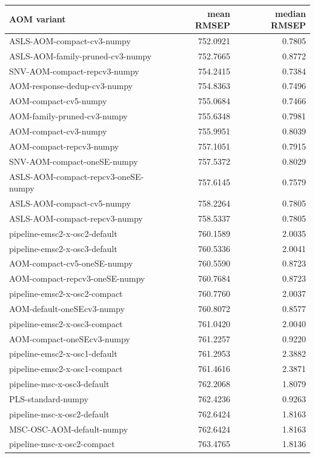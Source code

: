 \begin{tabular}{lrr}
\toprule
AOM variant & mean RMSEP & median RMSEP \\
\midrule
ASLS-AOM-compact-cv3-numpy & 752.0921 & 0.7805 \\
ASLS-AOM-family-pruned-cv3-numpy & 752.7665 & 0.8772 \\
SNV-AOM-compact-repcv3-numpy & 754.2415 & 0.7384 \\
AOM-response-dedup-cv3-numpy & 754.8363 & 0.7496 \\
AOM-compact-cv5-numpy & 755.0684 & 0.7466 \\
AOM-family-pruned-cv3-numpy & 755.6348 & 0.7981 \\
AOM-compact-cv3-numpy & 755.9951 & 0.8039 \\
AOM-compact-repcv3-numpy & 757.1051 & 0.7915 \\
SNV-AOM-compact-oneSE-numpy & 757.5372 & 0.8029 \\
ASLS-AOM-compact-repcv3-oneSE-numpy & 757.6145 & 0.7579 \\
ASLS-AOM-compact-cv5-numpy & 758.2264 & 0.7805 \\
ASLS-AOM-compact-repcv3-numpy & 758.5337 & 0.7805 \\
pipeline-emsc2-x-osc2-default & 760.1589 & 2.0035 \\
pipeline-emsc2-x-osc3-default & 760.5336 & 2.0041 \\
AOM-compact-cv5-oneSE-numpy & 760.5590 & 0.8723 \\
AOM-compact-repcv3-oneSE-numpy & 760.7684 & 0.8723 \\
pipeline-emsc2-x-osc2-compact & 760.7760 & 2.0037 \\
AOM-default-oneSEcv3-numpy & 760.8072 & 0.8577 \\
pipeline-emsc2-x-osc3-compact & 761.0420 & 2.0040 \\
AOM-compact-oneSEcv3-numpy & 761.2257 & 0.9220 \\
pipeline-emsc2-x-osc1-default & 761.2953 & 2.3882 \\
pipeline-emsc2-x-osc1-compact & 761.4616 & 2.3871 \\
pipeline-msc-x-osc3-default & 762.2068 & 1.8079 \\
PLS-standard-numpy & 762.4236 & 0.9263 \\
pipeline-msc-x-osc2-default & 762.6424 & 1.8163 \\
MSC-OSC-AOM-default-numpy & 762.6424 & 1.8163 \\
pipeline-msc-x-osc2-compact & 763.4765 & 1.8136 \\

\end{tabular}
